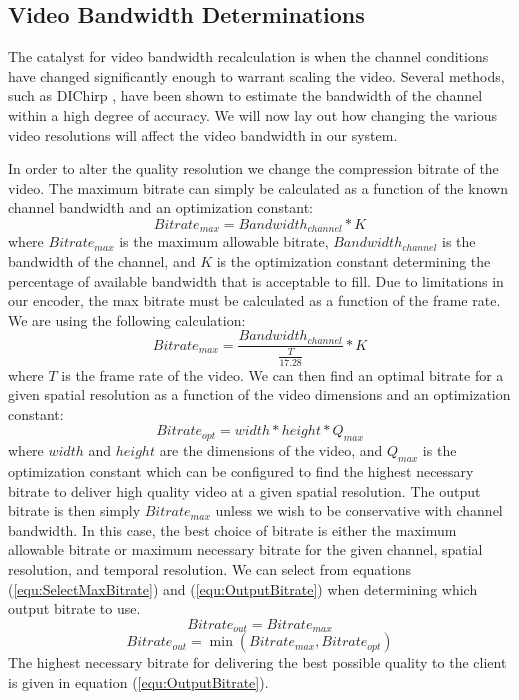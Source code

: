 \documentclass[a4paper,12pt]{article}
\begin{document}
\subsection{Video Bandwidth Determinations}
The catalyst for video bandwidth recalculation is when the channel conditions have changed significantly enough to warrant scaling the video. Several methods, such as DIChirp \cite{DIChirp}, have been shown to estimate the bandwidth of the channel within a high degree of accuracy. We will now lay out how changing the various video resolutions will affect the video bandwidth in our system.

In order to alter the quality resolution we change the compression bitrate of the video. The maximum bitrate can simply be calculated as a function of the known channel bandwidth and an optimization constant:
\begin{equation}
\label{equ:BitrateCalculation}
Bitrate_{max} = Bandwidth_{channel} * K
\end{equation}
where $Bitrate_{max}$  is the maximum allowable bitrate, $Bandwidth_{channel}$ is the bandwidth of the channel, and $K$ is the optimization constant determining the percentage of available bandwidth that is acceptable to fill. Due to limitations in our encoder, the max bitrate must be calculated as a function of the frame rate. We are using the following calculation: 
\begin{equation}
\label{equ:LimitedBitrateCalculation}
Bitrate_{max} = \frac {Bandwidth_{channel}}{\frac {T} {17.28} } * K
\end{equation}
where $T$ is the frame rate of the video. We can then find an optimal bitrate for a given spatial resolution as a function of the video dimensions and an optimization constant:
\begin{equation}
\label{equ:OptimalBitrate}
Bitrate_{opt} = width * height * Q_{max}
\end{equation}
where $width$ and $height$ are the dimensions of the video, and $Q_{max}$ is the optimization constant which can be configured to find the highest necessary bitrate to deliver high quality video at a given spatial resolution. The output bitrate is then simply $Bitrate_{max}$ unless we wish to be conservative with channel bandwidth. In this case, the best choice of bitrate is either the maximum allowable bitrate or maximum necessary bitrate for the given channel, spatial resolution, and temporal resolution. We can select from equations (\ref{equ:SelectMaxBitrate}) and (\ref{equ:OutputBitrate}) when determining which output bitrate to use.
\begin{equation}
\label{equ:SelectMaxBitrate}
Bitrate_{out} = Bitrate_{max}
\end{equation}
\begin{equation}
\label{equ:OutputBitrate}
Bitrate_{out} = \min (Bitrate_{max} , Bitrate_{opt})
\end{equation}
The highest necessary bitrate for delivering the best possible quality to the client is given in equation (\ref{equ:OutputBitrate}).
\end{document}

